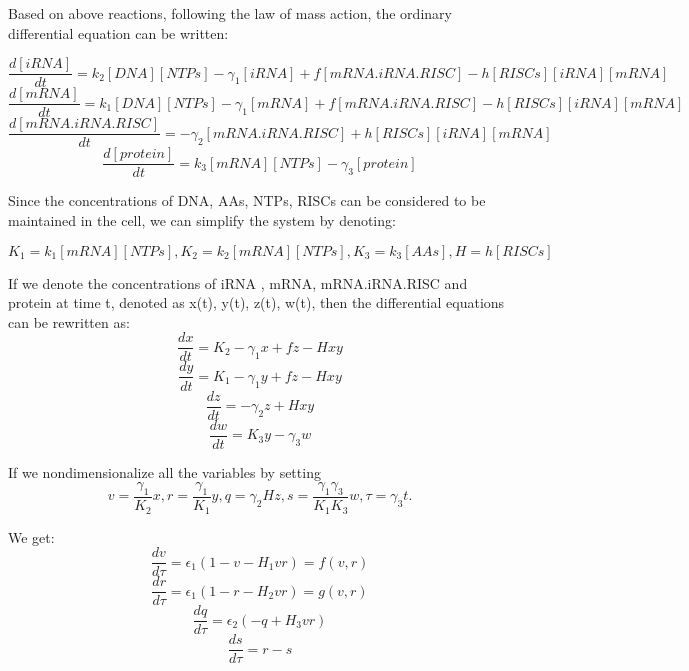 \documentclass[fleqn,10pt]{wlscirep}
\begin{document}
Based on above reactions, following the law of mass action, the ordinary differential equation can be written:

\begin{equation}
\frac{d[iRNA]}{dt} = k_2[DNA][NTPs] - \gamma_1[iRNA] + f[mRNA.iRNA.RISC] - h[RISCs][iRNA][mRNA] 
\end{equation}
\begin{equation}
\frac{d[mRNA]}{dt} = k_1[DNA][NTPs] - \gamma_1[mRNA] + f[mRNA.iRNA.RISC] - h[RISCs][iRNA][mRNA]  
\end{equation}
\begin{equation}
\frac{d[mRNA.iRNA.RISC]}{dt} = - \gamma_2[mRNA.iRNA.RISC] + h[RISCs][iRNA][mRNA] 
\end{equation}
\begin{equation}
\frac{d[protein]}{dt} = k_3[mRNA][NTPs] - \gamma_3[protein]
\end{equation}

Since the concentrations of DNA, AAs, NTPs, RISCs can be considered to be maintained in the cell, we can simplify the system by denoting:

\begin{equation}
K_1 = k_1[mRNA][NTPs], K_2 = k_2[mRNA][NTPs], K_3 = k_3[AAs], H = h[RISCs]
\end{equation}

If we denote the concentrations of iRNA , mRNA, mRNA.iRNA.RISC and protein at time t, denoted as x(t), y(t), z(t), w(t), then the differential equations can be rewritten as:
\begin{equation}
\frac{dx}{dt} = K_2 - \gamma_1x + fz - Hxy 
\end{equation}
\begin{equation}
\frac{dy}{dt} = K_1 - \gamma_1y + fz - Hxy
\end{equation}
\begin{equation}
\frac{dz}{dt} = - \gamma_2z + Hxy 
\end{equation}
\begin{equation}
\frac{dw}{dt} = K_3y - \gamma_3w
\end{equation}

If we nondimensionalize all the variables by setting
\begin{equation}
v = \frac{\gamma_1}{K_2}x,   
r = \frac{\gamma_1}{K_1}y,  
q = \gamma_2Hz,  
s = \frac{\gamma_1\gamma_3}{K_1K_3}w,  
\tau = \gamma_3t.
\end{equation}

We get:
\begin{equation}
\frac{dv}{d\tau} = \epsilon_1 (1 - v - H_1vr) = f(v, r)
\end{equation}
\begin{equation}
\frac{dr}{d\tau} = \epsilon_1 (1 - r - H_2vr) = g(v, r)
\end{equation}
\begin{equation}
\frac{dq}{d\tau} = \epsilon_2 (- q + H_3vr)
\end{equation}
\begin{equation}
\frac{ds}{d\tau} = r - s
\end{equation}
\end{document}
